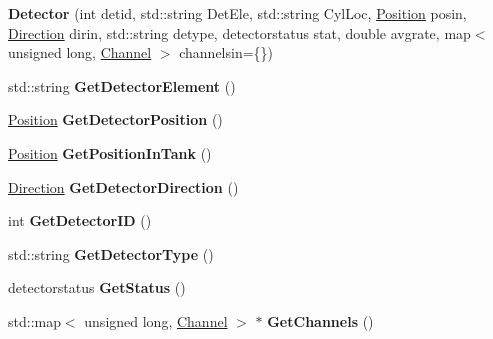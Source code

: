 \begin{DoxyCompactItemize}
\item 
\hypertarget{classDetector_acc63b0828ae0a8fecca2f71b26f14531}{
{\bfseries Detector} (int detid, std::string DetEle, std::string CylLoc, \hyperlink{classPosition}{Position} posin, \hyperlink{classDirection}{Direction} dirin, std::string detype, detectorstatus stat, double avgrate, map$<$ unsigned long, \hyperlink{classChannel}{Channel} $>$ channelsin=\{\})}
\label{classDetector_acc63b0828ae0a8fecca2f71b26f14531}

\item 
\hypertarget{classDetector_a7622dcc0d32a77b2d81f3346f9d486a6}{
std::string {\bfseries GetDetectorElement} ()}
\label{classDetector_a7622dcc0d32a77b2d81f3346f9d486a6}

\item 
\hypertarget{classDetector_ae706947ab25223c2707b0b04fa1cf999}{
\hyperlink{classPosition}{Position} {\bfseries GetDetectorPosition} ()}
\label{classDetector_ae706947ab25223c2707b0b04fa1cf999}

\item 
\hypertarget{classDetector_ace3843de946676dac6a031ab21ab2537}{
\hyperlink{classPosition}{Position} {\bfseries GetPositionInTank} ()}
\label{classDetector_ace3843de946676dac6a031ab21ab2537}

\item 
\hypertarget{classDetector_a80cbd9a7402579d601953a91d6883a94}{
\hyperlink{classDirection}{Direction} {\bfseries GetDetectorDirection} ()}
\label{classDetector_a80cbd9a7402579d601953a91d6883a94}

\item 
\hypertarget{classDetector_a85412b023bb48b28e27c9b308857653f}{
int {\bfseries GetDetectorID} ()}
\label{classDetector_a85412b023bb48b28e27c9b308857653f}

\item 
\hypertarget{classDetector_a0f5e4f78e6e64903f46679577609a320}{
std::string {\bfseries GetDetectorType} ()}
\label{classDetector_a0f5e4f78e6e64903f46679577609a320}

\item 
\hypertarget{classDetector_adf81db079151a065407d44558a6240b3}{
detectorstatus {\bfseries GetStatus} ()}
\label{classDetector_adf81db079151a065407d44558a6240b3}

\item 
\hypertarget{classDetector_a1aa42e2f99fd99f2b09d2ab0a1ff4405}{
std::map$<$ unsigned long, \hyperlink{classChannel}{Channel} $>$ $\ast$ {\bfseries GetChannels} ()}
\label{classDetector_a1aa42e2f99fd99f2b09d2ab0a1ff4405}


\end{DoxyCompactItemize}
